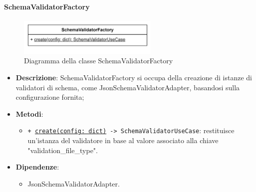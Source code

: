 
\paragraph{SchemaValidatorFactory} \label{SchemaValidatorFactory}
\begin{figure}[H]
    \centering
    \includegraphics[width=0.6\textwidth]{assets/Backend/schema_validator_factory.png}
    \caption{Diagramma della classe SchemaValidatorFactory}
  \end{figure}
\begin{itemize}
    \item \textbf{Descrizione}: SchemaValidatorFactory si occupa della creazione di istanze di validatori di schema, come JsonSchemaValidatorAdapter, basandosi sulla configurazione fornita;
    \item \textbf{Metodi}:
    \begin{itemize}
        \item \texttt{+ \underline{create(config: dict)} -> SchemaValidatorUseCase}: restituisce un'istanza del validatore in base al valore associato alla chiave "validation_file_type".
    \end{itemize}
    \item \textbf{Dipendenze}:
    \begin{itemize}
        \item JsonSchemaValidatorAdapter.
    \end{itemize}
\end{itemize}  

